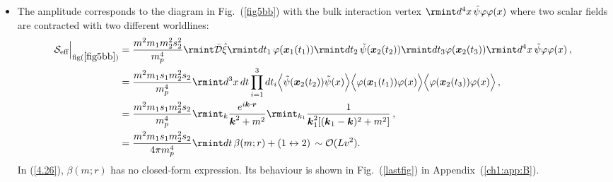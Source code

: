 \begin{itemize}
 \item The amplitude corresponds to the diagram in Fig.~(\ref{fig5bb}) with the bulk interaction vertex $\rmint d^4 x \,\Tilde{\psi}\varphi\varphi(x)$ where two scalar fields are contracted with two different worldlines:
    \begin{align}
        \begin{split}
            \mathcal{S}_{\text{eff}}\Big |_{\text{fig}(\ref{fig5bb})}&=\frac{m^2m_1 m_2^2 s_2^2}{m_{p}^4}\rmint\Bar{\mathcal{D}}\Hat{\xi}\rmint dt_1 \,\varphi(\boldsymbol{x}_1(t_1))\rmint dt_2 \,\Tilde{\psi}(\boldsymbol{x}_2(t_2))\rmint dt_3 \varphi(\boldsymbol{x}_2(t_3))\rmint d^4 x \,\Tilde{\psi}\varphi\varphi(x)\,,\\ &=\frac{m^2m_1s_1 m_2^2 s_2}{m_p^4} \rmint d^3x\,dt\prod_{i=1}^3 dt_i \Big\langle\Tilde{\psi}(\boldsymbol{x}_2(t_2))\Tilde{\psi}(x)\Big\rangle \Big\langle\varphi(\boldsymbol{x}_1(t_1))\varphi(x) \Big\rangle\Big\langle\varphi(\boldsymbol{x}_2(t_3))\varphi(x) \Big\rangle\,,\\ &
            =\frac{m^2m_1s_1 m_2^2 s_2}{m_p^4}\rmint_{k}\frac{e^{i\boldsymbol{k}\cdot \boldsymbol{r}}}{\boldsymbol{k}^2+m^2}\rmint_{k_1}\frac{1}{\boldsymbol{k}_1^2[(\boldsymbol{k}_1-\boldsymbol{k})^2+m^2]}\,,\\ &
           = \frac{m^2 m_1s_1 m_2^2 s_2}{4\pi m_p^4}\rmint dt \,\beta(m;r)+(1\leftrightarrow 2)\,\sim \mathcal{O}(Lv^2).\label{4.26}
        \end{split}
    \end{align}
    In (\ref{4.26}), $\beta(m;r)$ has no closed-form expression. Its behaviour is shown in Fig.~(\ref{lastfig}) in Appendix~(\ref{ch1:app:B}).
\end{itemize}

